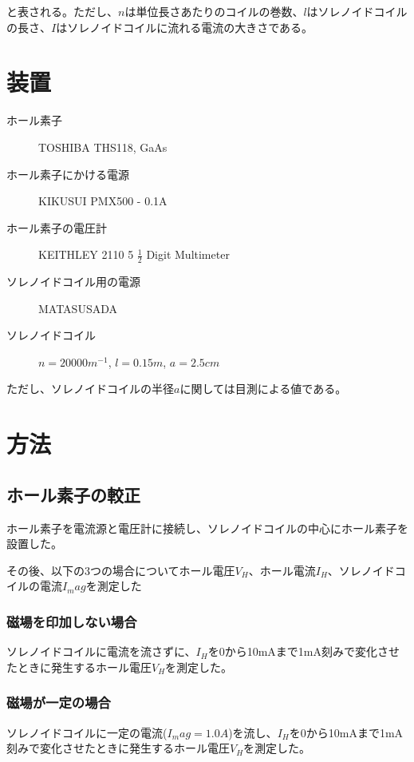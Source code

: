 \documentclass[uplatex,11pt]{jsarticle}
\begin{document}
と表される。ただし、$n$は単位長さあたりのコイルの巻数、$l$はソレノイドコイルの長さ、$I$はソレノイドコイルに流れる電流の大きさである。

\section{装置}

\begin{description}
    \item[ホール素子] TOSHIBA THS118, GaAs
    \item[ホール素子にかける電源] KIKUSUI PMX500 - 0.1A
    \item[ホール素子の電圧計] KEITHLEY 2110 5 $\frac{1}{2}$ Digit Multimeter 
    \item[ソレノイドコイル用の電源] MATASUSADA
    \item[ソレノイドコイル] $n = 20000 m^{-1}$, $l = 0.15 m$, $a = 2.5 cm$
\end{description}

ただし、ソレノイドコイルの半径$a$に関しては目測による値である。

\section{方法}

\subsection{ホール素子の較正}

ホール素子を電流源と電圧計に接続し、ソレノイドコイルの中心にホール素子を設置した。

その後、以下の3つの場合についてホール電圧$V_H$、ホール電流$I_H$、ソレノイドコイルの電流$I_mag$を測定した

\subsubsection{磁場を印加しない場合}

ソレノイドコイルに電流を流さずに、$I_H$を0から10mAまで1mA刻みで変化させたときに発生するホール電圧$V_H$を測定した。

\subsubsection{磁場が一定の場合}

ソレノイドコイルに一定の電流($I_mag = 1.0A$)を流し、$I_H$を0から10mAまで1mA刻みで変化させたときに発生するホール電圧$V_H$を測定した。
\end{document}
